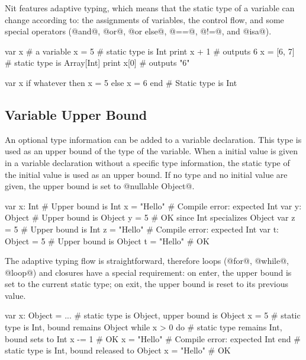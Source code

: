 Nit features adaptive typing, which means that the static type of a variable can change according to:
the assignments of variables,
the control flow,
and some special operators (@and@, @or@, @or else@, @==@, @!=@, and @isa@).

\begin{multicols}{2}
\begin{lst}
var x # a variable
x = 5
# static type is Int
print x + 1 # outputs 6
x = [6, 7]
# static type is Array[Int]
print x[0] # outputs "6"
\end{lst}
\columnbreak
\begin{lst}
var x
if whatever then
	x = 5
else
	x = 6
end
# Static type is Int
\end{lst}
\end{multicols}

\subsection{Variable Upper Bound}\label{upper bound}

An optional type information can be added to a variable declaration.
This type is used as an upper bound of the type of the variable.
When a initial value is given in a variable declaration without a specific type information, the static type of the initial value is used as an upper bound.
If no type and no initial value are given, the upper bound is set to @nullable Object@.

\begin{lst}
var x: Int # Upper bound is Int
x = "Hello" # Compile error: expected Int
var y: Object # Upper bound is Object
y = 5 # OK since Int specializes Object
var z = 5 # Upper bound is Int
z = "Hello" # Compile error: expected Int
var t: Object = 5 # Upper bound is Object
t = "Hello" # OK
\end{lst}

The adaptive typing flow is straightforward, therefore loops (@for@, @while@, @loop@) and closures have a special requirement: on enter, the upper bound is set to the current static type; on exit, the upper bound is reset to its previous value.

\begin{lst}
var x: Object = ...
# static type is Object, upper bound is Object
x = 5
# static type is Int, bound remains Object
while x > 0 do
 	# static type remains Int, bound sets to Int
	x -= 1 # OK
	x = "Hello" # Compile error: expected Int
end
# static type is Int, bound released to Object
x = "Hello" # OK
\end{lst}

